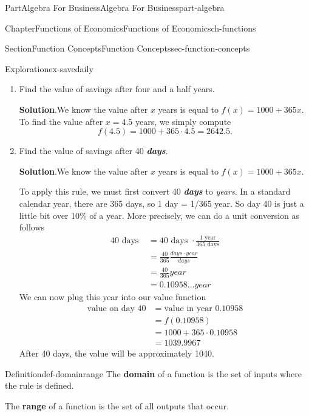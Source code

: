 \documentclass[oneside,10pt,]{tufte-book}
\newcommand{\blocktitlefont}{\relax}
\newcommand{\alert}[1]{\textbf{\textit{#1}}}
\newcommand{\terminology}[1]{\textbf{#1}}
\numberwithin{equation}{chapter}
\newcommand{\amp}{&}
\begin{document}
\begin{partptx}{Part}{Algebra For Business}{}{Algebra For Business}{}{}{part-algebra}
\begin{chapterptx}{Chapter}{Functions of Economics}{}{Functions of Economics}{}{}{ch-functions}
\begin{sectionptx}{Section}{Function Concepts}{}{Function Concepts}{}{}{sec-function-concepts}
\begin{exploration}{Exploration}{}{ex-savedaily}
\begin{enumerate}[font=\bfseries,label=(\alph*),ref=\alph*]
\begin{figureptx}{Figure}{}{fig_algebra_domainrange}{}
\begin{image}{0}{1}{0}{}
{\begin{tikzpicture}
\end{tikzpicture}
}%
\end{image}%
\tcblower
\end{figureptx}%
\item{}Find the value of savings after four and a half years.%
\par\smallskip%
\noindent\textbf{\blocktitlefont Solution}.\hypertarget{ex-savedaily-4-2}{}\quad{}We know the value after \(x\) years is equal to \(f(x) = 1000 + 365 x \). To find the value after \(x=4.5\) years, we simply compute%
\begin{equation*}
f(4.5) = 1000 + 365\cdot 4.5 = 2642.5\text{.}
\end{equation*}
%
\item{}Find the value of savings after 40 \alert{days}.%
\par\smallskip%
\noindent\textbf{\blocktitlefont Solution}.\hypertarget{ex-savedaily-5-2}{}\quad{}We know the value after \(x\) years is equal to \(f(x) = 1000 + 365 x \).%
\par
To apply this rule, we must first convert 40 \alert{days} to \emph{years}.  In a standard calendar year, there are 365 days, so 1 day = 1\slash{}365 year.  So day 40 is just a little bit over 10\% of a year.  More precisely, we can do a unit conversion as follows%
\begin{align*}
40\text{ days } \amp = 40 \text{ days }\cdot \frac{1 \text{ year}}{365\text{ days}} \\
\amp = \frac{40}{365} \frac{days\cdot year}{days}\\
\amp = \frac{40}{365} year\\
\amp = 0.10958\dots year
\end{align*}
We can now plug this year into our value function%
\begin{align*}
\text{value on day 40} \amp = \text{value in year }0.10958 \\
\amp = f(0.10958) \\
\amp = 1000 + 365\cdot 0.10958\\
\amp = 1039.9967 
\end{align*}
After 40 days, the value will be approximately \textdollar{}1040.%
\end{enumerate}%
\end{exploration}%
\begin{definition}{Definition}{}{def-domainrange}%
The \terminology{domain} of a function is the set of inputs where the rule is defined.%
\par
The \terminology{range} of a function is the set of all outputs that occur.%

\end{definition}
\end{sectionptx}
\end{chapterptx}
\end{partptx}
\end{document}
